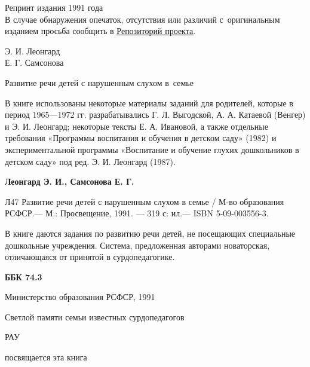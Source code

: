 \documentclass{book}
\begin{document}
\thispagestyle{plain}
\vfill
\begin{center}
{\Large Репринт издания 1991 года} \\
В случае обнаружения опечаток, отсутствия или различий с~оригинальным изданием просьба сообщить в \href{https://github.com/Fe-Ti/Reprints}{\underline{\color{blue} Репозиторий проекта}}.
\vspace{10em}
\end{center}
Э. И. Леонгард \\
Е. Г. Самсонова \\
\vspace{5em}
\begin{center}
{\LARGE Развитие речи детей с нарушенным слухом в~семье} \\
\end{center}
\vfill
\clearpage
\thispagestyle{plain}


В книге использованы некоторые материалы заданий для родителей, которые
в период 1965---1972 гг. разрабатывались Г. Л. Выгодской, А. А. Катаевой
(Венгер) и Э. И. Леонгард; некоторые тексты Е. А. Ивановой, а также
отдельные требования «Программы воспитания и обучения в детском саду»
(1982) и экспериментальной программы «Воспитание и обучение глухих
дошкольников в детском саду» под ред. Э. И. Леонгард (1987).

\vspace{5\parindent}

\textbf{Леонгард Э. И., Самсонова Е. Г.}

Л47\hspace{\parindent} Развитие речи детей с нарушенным слухом в семье /
М-во образования РСФСР.--- М.: Просвещение, 1991. ---
319 с: ил.--- ISBN 5-09-003556-3.

В книге даются задания по развитию речи детей, не посещающих специальные
дошкольные учреждения. Система, предложенная авторами новаторская,
отличающаяся от принятой в сурдопедагогике. \\

\vfill

\textbf{ББК 74.3}

\textcopyright Министерство образования РСФСР, 1991

\pagebreak
\pagestyle{mainstyle}

\hfill \begin{minipage}[c]{0.3\textwidth} \small {\raggedleft
Светлой памяти семьи известных 
сурдопедагогов} \\
\begin{center}
РАУ  \\ 
\end{center}
{\raggedleft посвящается эта книга}
\end{minipage}
\end{document}
